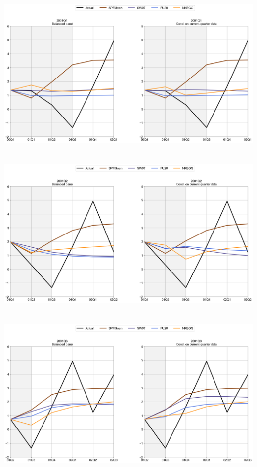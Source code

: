 \documentclass{article}
\begin{document}
\includegraphics[scale=0.5]{Top3_models_2001Q1}\\ \bigskip \\ \bigskip  \\
\includegraphics[scale=0.5]{Top3_models_2001Q2}\\  \bigskip \\ \bigskip  \\
\includegraphics[scale=0.5]{Top3_models_2001Q3}\\  \bigskip \\ \bigskip  \\
\end{document}
